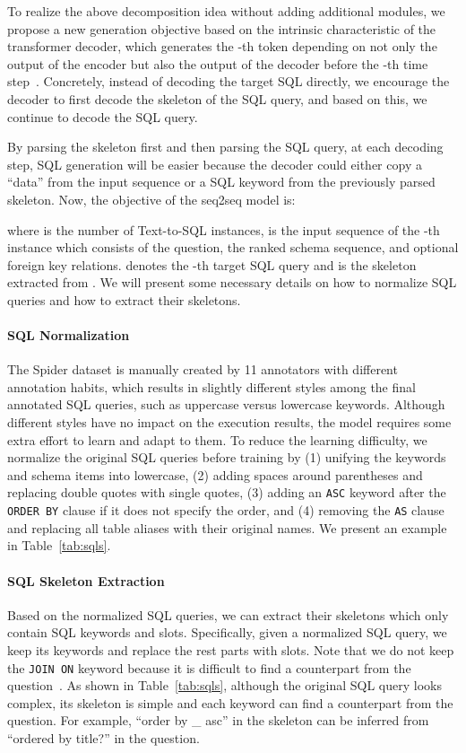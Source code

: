 \documentclass[letterpaper]{article} \usepackage{aaai23}  \usepackage{times}  \usepackage{helvet}  \usepackage{courier}  \usepackage[hyphens]{url}  \usepackage{graphicx} \urlstyle{rm} \def\UrlFont{\rm}  \usepackage{natbib}  \usepackage{caption} \frenchspacing  \setlength{\pdfpagewidth}{8.5in}  \setlength{\pdfpageheight}{11in}  \usepackage{algorithm}
\newcommand{\beq}[1]{}
\begin{document}
To realize the above decomposition idea without adding additional modules, we propose a new generation objective based on the intrinsic characteristic of the transformer decoder, which generates the -th token depending on not only the output of the encoder but also the output of the decoder before the -th time step~\cite{ashish2017attention}. Concretely, instead of decoding the target SQL directly, we encourage the decoder to first decode the skeleton of the SQL query, and based on this, we continue to decode the SQL query.

By parsing the skeleton first and then parsing the SQL query, at each decoding step, SQL generation will be easier because the decoder could either copy a ``data'' from the input sequence or a SQL keyword from the previously parsed skeleton. Now, the objective of the seq2seq model is:
\beq{
\mathcal{L}_2 =  \frac{1}{G}\sum_{i=1}^G p(l^{s}_i,l_i|S_i),
}

\noindent where  is the number of Text-to-SQL instances,  is the input sequence of the -th instance which consists of the question, the ranked schema sequence, and optional foreign key relations.  denotes the -th target SQL query and  is the skeleton extracted from . We will present some necessary details on how to normalize SQL queries and how to extract their skeletons.

\paragraph{SQL Normalization}
The Spider dataset is manually created by 11 annotators with different annotation habits, which results in slightly different styles among the final annotated SQL queries, such as uppercase versus lowercase keywords. Although different styles have no impact on the execution results, the model requires some extra effort to learn and adapt to them. To reduce the learning difficulty, we normalize the original SQL queries before training by (1) unifying the keywords and schema items into lowercase, (2) adding spaces around parentheses and replacing double quotes with single quotes, (3) adding an \texttt{ASC} keyword after the \texttt{ORDER BY} clause if it does not specify the order, and (4) removing the \texttt{AS} clause and replacing all table aliases with their original names. We present an example in Table~\ref{tab:sqls}.

\paragraph{SQL Skeleton Extraction}
Based on the normalized SQL queries, we can extract their skeletons which only contain SQL keywords and slots. Specifically, given a normalized SQL query, we keep its keywords and replace the rest parts with slots. Note that we do not keep the \texttt{JOIN ON} keyword because it is difficult to find a counterpart from the question~\cite{yujian2021naturalsql}. As shown in Table~\ref{tab:sqls}, although the original SQL query looks complex, its skeleton is simple and each keyword can find a counterpart from the question. For example, ``order by \_ asc'' in the skeleton can be inferred from ``ordered by title?'' in the question.
\end{document}
